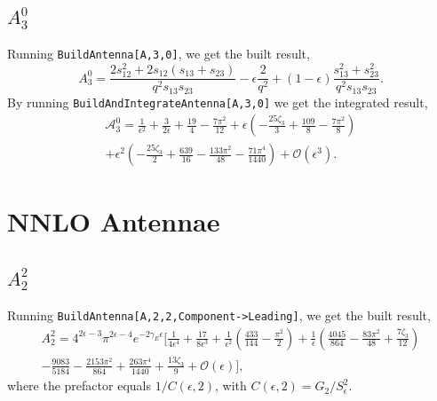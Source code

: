 \subsection{$A_3^0$}
Running \texttt{BuildAntenna[A,3,0]}, we get the built result,
\begin{equation}
    A_3^0 = \frac{2s_{12}^2+2s_{12}(s_{13}+s_{23})}{q^2s_{13}s_{23}}-\epsilon\frac{2}{q^2}+(1-\epsilon)\frac{s_{13}^2+s_{23}^2}{q^2s_{13}s_{23}}.
\end{equation}
By running \texttt{BuildAndIntegrateAntenna[A,3,0]} we get the integrated result, 
\begin{equation}
    \begin{gathered}
        \mathcal A_3^0 = \frac1{\epsilon^2} + \frac3{2\epsilon} + \frac{19}4 - \frac{7\pi^2}{12} + \epsilon\!\left(-\frac{25\zeta_3}{3}+\frac{109}8-\frac{7\pi^2}8\right)\\ 
        + \epsilon^2\!\left(-\frac{25\zeta_3}2+\frac{639}{16}-\frac{133\pi^2}{48}-\frac{71\pi^4}{1440}\right) + \mathcal O\!\left(\epsilon^3\right).
    \end{gathered}
\end{equation}

\section{NNLO Antennae}

\subsection{$A_2^2$}

Running \texttt{BuildAntenna[A,2,2,Component->Leading]}, we get the built result,
\begin{equation}
    \begin{gathered}
        A_2^2 = 4^{2\epsilon-3}\pi^{2\epsilon-4}e^{-2\gamma_E\epsilon}\bigg[\frac1{4\epsilon^4}+\frac{17}{8\epsilon^3}+\frac1{\epsilon^2}\!\left(\frac{433}{144}-\frac{\pi^2}2\right)+\frac1\epsilon\!\left(\frac{4045}{864}-\frac{83\pi^2}{48}+\frac{7\zeta_3}{12}\right)\\
        - \frac{9083}{5184}-\frac{2153\pi^2}{864}+\frac{263\pi^4}{1440}+\frac{13\zeta_3}{9}+\mathcal O(\epsilon)\bigg],
    \end{gathered}
\end{equation}
where the prefactor equals $1/C(\epsilon,2)$, with $C(\epsilon,2)=G_2/S_\epsilon^2$.

